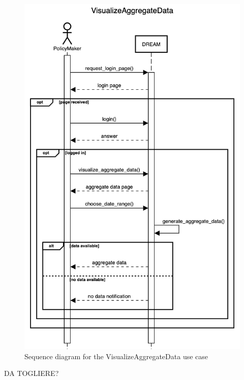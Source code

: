 \documentclass{article}
\begin{document}
\begin{figure}[H]
    \centering
	\includegraphics[scale=0.5]{sequence_diagrams/VisualizeAggregateData}
    \caption{Sequence diagram for the VisualizeAggregateData use case}
\end{figure}

\color{red} DA TOGLIERE? \color{black}

\end{document}
